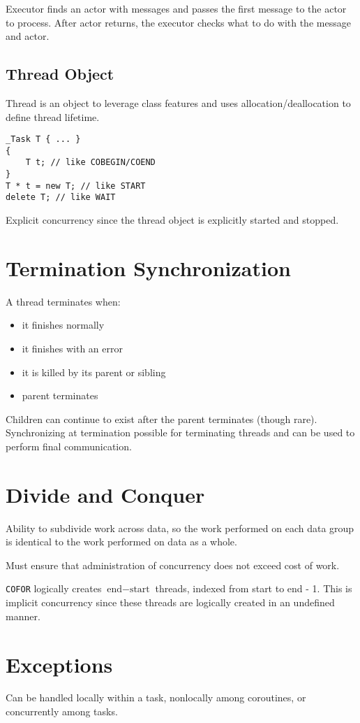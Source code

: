 \documentclass[11pt]{article}
\begin{document}
Executor finds an actor with messages and passes the first message to the actor to process.
After actor returns, the executor checks what to do with the message and actor.
\subsection{Thread Object}
\label{sec:org6a2aa6d}
Thread is an object to leverage class features and uses allocation/deallocation to define
thread lifetime.

\begin{verbatim}
_Task T { ... }
{
    T t; // like COBEGIN/COEND
}
T * t = new T; // like START
delete T; // like WAIT
\end{verbatim}

Explicit concurrency since the thread object is explicitly started and stopped.
\section{Termination Synchronization}
\label{sec:org2364157}
A thread terminates when:
\begin{itemize}
\item it finishes normally
\item it finishes with an error
\item it is killed by its parent or sibling
\item parent terminates
\end{itemize}

Children can continue to exist after the parent terminates (though rare).
Synchronizing at termination possible for terminating threads and can be used to perform final
communication.
\section{Divide and Conquer}
\label{sec:org77d8205}
Ability to subdivide work across data, so the work performed on each data group is identical to the work
performed on data as a whole.

Must ensure that administration of concurrency does not exceed cost of work.

\texttt{COFOR} logically creates \(\text{end} - \text{start}\) threads, indexed from start to end - 1.
This is implicit concurrency since these threads are logically created in an undefined manner.
\section{Exceptions}
\label{sec:org05868a5}
Can be handled locally within a task, nonlocally among coroutines, or concurrently among tasks.
\end{document}
